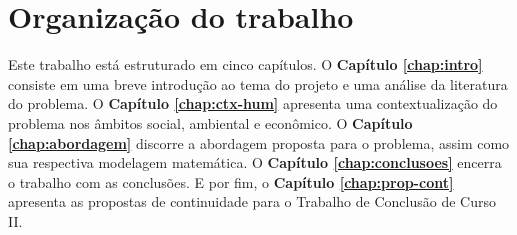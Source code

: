 \section{Organização do trabalho} %
\label{sec:organização_do_trabalho}
Este trabalho está estruturado em cinco capítulos. O \textbf{Capítulo \ref{chap:intro}} consiste em uma breve introdução ao tema do projeto e uma análise da literatura do problema. O \textbf{Capítulo \ref{chap:ctx-hum}} apresenta uma contextualização do problema nos âmbitos social, ambiental e econômico. O \textbf{Capítulo \ref{chap:abordagem}} discorre a abordagem proposta para o problema, assim como sua respectiva modelagem matemática. O \textbf{Capítulo \ref{chap:conclusoes}} encerra o trabalho com as conclusões. E por fim, o \textbf{Capítulo \ref{chap:prop-cont}} apresenta as propostas de continuidade para o Trabalho de Conclusão de Curso II.




